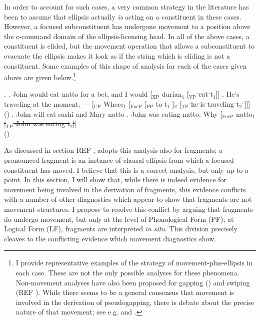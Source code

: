 \documentclass[11pt,letterpaper]{article}
\begin{document}
In order to account for such cases, a very common strategy in the literature has been to assume that ellipsis actually \emph{is} acting on a constituent in these cases. However, a focused subconstituent has undergone movement to a position above the c-command domain of the ellipsis-licensing head. In all of the above cases, a constituent is elided, but the movement operation that allows a subconstituent to evacuate the ellipsis makes it look as if the string which is eliding is not a constituent. Some examples of this shape of analysis for each of the cases given above are given below.\footnote{I provide representative examples of the strategy of movement-plus-ellipsis in each case. These are not the only possible analyses for these phenomena. Non-movement analyses have also been proposed for gapping (\cite{Joh09}) and swiping (REF %
). While there seems to be a general consensus that movement is involved in the derivation of pseudogapping, %
there is debate about the precise nature of that movement; see e.g. \cite{Jay90} and \cite{Ta04}.}

\ex. 	\a. John would eat natto for a bet, and I would [$_{\mathrm{XP}}$ durian$_1$ \sout{[$_{\mathrm{VP}}$ eat t$_1$]}]
	\b. He's traveling at the moment. --- [$_{\mathrm{CP}}$ Where$_1$ [$_{\mathrm{FocP}}$ [$_{\mathrm{PP}}$ to t$_1$ ]$_2$ \sout{[$_{\mathrm{TP}}$ he is traveling t$_2$ ]}]]\\
		(\cite{HarAi07})
	\b. John will eat sushi and Mary natto %
	\b. John was eating natto. Why [$_{\mathrm{FocP}}$ natto$_1$ \sout{[$_{\mathrm{TP}}$ John was eating t$_2$]}]\\
		(\cite{NYO12, We12why})
		

As discussed in section REF %
, \cite{Me04} adopts this analysis also for fragments; a pronounced fragment is an instance of clausal ellipsis from which a focused constituent has moved. I believe that this is a correct analysis, but only up to a point. In this section, I will show that, while there is indeed evidence for movement being involved in the derivation of fragments, this evidence conflicts with a number of other diagnostics which appear to show that fragments are not movement structures. I propose to resolve this conflict by arguing that fragments do undergo movement, but only at the level of Phonological Form (PF); at Logical Form (LF), fragments are interpreted {\it in situ}. This division precisely cleaves to the conflicting evidence which movement diagnostics show.
\end{document}
